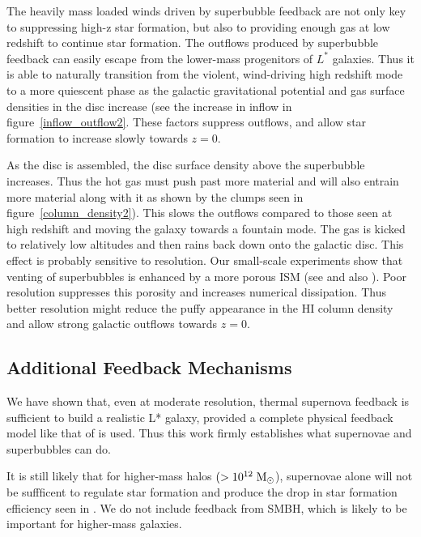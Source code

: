 The heavily mass loaded winds driven by superbubble feedback are not only key to
suppressing high-z star formation, but also to providing enough gas at low
redshift to continue star formation.  The outflows produced by superbubble
feedback can easily escape from the lower-mass progenitors of ${L^*}$ galaxies.
Thus it is able to naturally transition from the violent, wind-driving high
redshift mode to a more quiescent phase as the galactic gravitational potential
and gas surface densities in the disc increase (see the increase in inflow in
figure~\ref{inflow_outflow2}.  These factors suppress outflows, and allow star
formation to increase slowly towards $z=0$.

As the disc is assembled, the disc surface density above the 
superbubble increases.  Thus the hot gas must push past
more material and will also entrain more material along with it as shown by
 the clumps seen in figure~\ref{column_density2}).  
This slows the outflows compared to those 
seen at high redshift and moving the galaxy
towards a fountain mode.  The gas is kicked to relatively low altitudes and
then rains back down onto the galactic disc.  This effect is probably
sensitive to resolution.  Our small-scale experiments show
 that venting of superbubbles is enhanced by a more porous ISM 
(see \citealt{Keller2014} and also \citealt{Nath2013}).  
Poor resolution suppresses this porosity and increases
numerical dissipation.  Thus better resolution might reduce the puffy
appearance in the HI column density and allow strong galactic
outflows towards $z=0$.  

\subsection{Additional Feedback Mechanisms}

We have shown that, even at moderate resolution, thermal supernova feedback is
sufficient to build a realistic L* galaxy, provided a complete
physical feedback model like that of \citet{Keller2014} is used.    
Thus this work firmly establishes what supernovae and superbubbles can do.

It is still likely that for higher-mass halos $(>10^{12}\; \rm{M_\odot}$),
supernovae alone will not be suffficent to regulate star formation and produce
the drop in star formation efficiency seen in \citet{Moster2013,Behroozi2013}.
We do not include feedback from SMBH, which is likely to be
important for higher-mass galaxies.  

